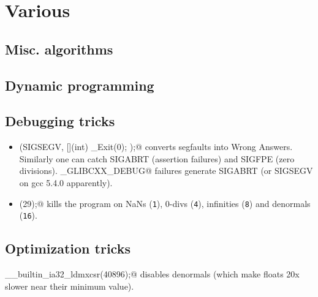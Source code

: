 \chapter{Various}


\section{Misc. algorithms}

\section{Dynamic programming}

\section{Debugging tricks}
	\begin{itemize}
		\item \verb@signal(SIGSEGV, [](int) { _Exit(0); });@ converts segfaults into Wrong Answers.
			Similarly one can catch SIGABRT (assertion failures) and SIGFPE (zero divisions).
			\verb@_GLIBCXX_DEBUG@ failures generate SIGABRT (or SIGSEGV on gcc 5.4.0 apparently).
		\item \verb@feenableexcept(29);@ kills the program on NaNs (\texttt 1), 0-divs (\texttt 4), infinities (\texttt 8) and denormals (\texttt{16}).
	\end{itemize}

\section{Optimization tricks}
	\verb@__builtin_ia32_ldmxcsr(40896);@ disables denormals (which make floats 20x slower near their minimum value).
